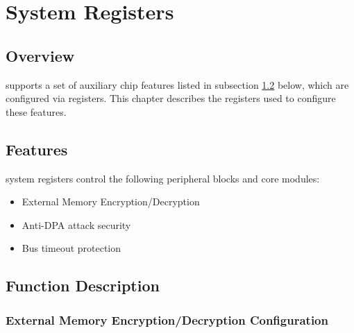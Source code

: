 \documentclass[main\_\_EN.tex]{subfiles}
\begin{document}

\ifglobal
\else
    {\let\clearpage\relax \listoftodos}
    \tableofcontents
\fi



\chapter{System Registers}
\label{mod:sysreg}
\hypertarget{sysreg}{}


\section{Overview}

\chipname{} supports a set of auxiliary chip features listed in subsection \ref{sec:sysreg-features} \textit{} below, which are configured via registers. This chapter describes the registers used to configure these features.


\section{Features}
\label{sec:sysreg-features}

\chipname{} system registers control the following peripheral blocks and core modules:

\begin{itemize}
    \item External Memory Encryption/Decryption
    \item Anti-DPA attack security
    \item Bus timeout protection
\end{itemize}


\section{Function Description}

\subsection{External Memory Encryption/Decryption Configuration}
\end{document}
